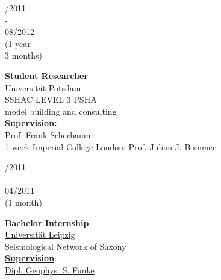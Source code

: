 \documentclass{article}
\begin{document}
\begin{minipage}[t]{0.69\textwidth}
\begin{minipage}{0.34\textwidth}
\begin{minipage}[t]{0.7\textwidth}
\begin{minipage}[t]{0.45\textwidth}
	\begin{minipage}[t]{0.25\textwidth}
		/2011\\ -\\ 08/2012 \\(1 year \\3 months)
		\end{minipage}
		\hfill
		\begin{minipage}[t]{0.75\textwidth}
		\textbf{Student Researcher}\\
		\href{https://www.uni-potsdam.de/}{\color{pblue}Universität Potsdam}\\
	    SSHAC LEVEL 3 PSHA\\ model building and consulting\\
	      \textbf{\underline{Supervision}:}\\
	     \href{http://www.geo.uni-potsdam.de/mitarbeiterdetails/show/96/Frank_Scherbaum.html/}{\color{pblue}Prof. Frank Scherbaum}\\
	    1 week Imperial College London: \href{https://www.imperial.ac.uk/people/j.bommer}{\color{pblue}Prof. Julian J. Bommer}
		\end{minipage}
		
		\vspace{0.3cm}
		
		
		\begin{minipage}[t]{0.25\textwidth}
		/2011\\ - \\ 04/2011\\(1 month)
		\end{minipage}		
		\hfill
		\begin{minipage}[t]{0.75\textwidth}
		\textbf{Bachelor Internship}\\
		\href{http://geologie.physgeo.uni-leipzig.de}{\color{pblue}Universität Leipzig}\\
	    Seismological Network of Saxony\\ 
	     \textbf{\underline{Supervision}}: \\
	     \href{mailto:sfunke@rz.uni-leipzig.de}{Dipl. Geophys. S. Funke}
		\end{minipage}
		

\end{minipage}
\end{minipage}
\end{minipage}
\end{minipage}
\end{document}
